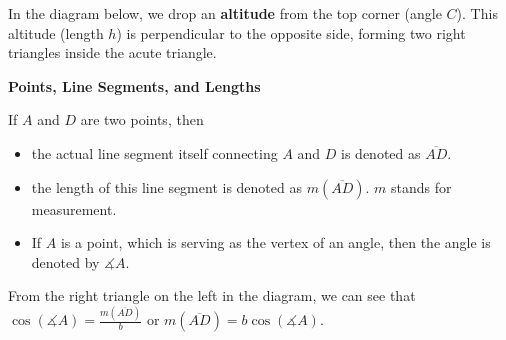 \documentclass{ximera}
\begin{document}
In the diagram below, we drop an \textbf{altitude} from the top corner (angle $C$). This altitude (length $h$) is perpendicular to the opposite side, forming two right triangles inside the acute triangle. 




\begin{image}[3in]
  \end{image}




\begin{notation} \textbf{\textcolor{red!50!green}{Points, Line Segments, and Lengths}}  

If $A$ and $D$ are two points, then 

\begin{itemize}
\item the actual line segment itself connecting $A$ and $D$ is denoted as $\overline{AD}$. 
\item the length of this line segment is denoted as $m(\overline{AD})$.  $m$ stands for measurement.
\item If $A$ is a point, which is serving as the vertex of an angle, then the angle is denoted by $\measuredangle A$.
\end{itemize}
\end{notation}





From the right triangle on the left in the diagram, we can see that $\cos(\measuredangle A) = \frac{m(\overline{AD})}{b}$ or $m(\overline{AD}) = b \cos(\measuredangle A)$. 
\end{document}
